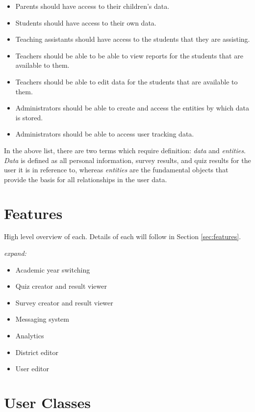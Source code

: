 \begin{itemize}
\item Parents should have access to their children's data.
\item Students should have access to their own data.
\item Teaching assistants should have access to the students that they are assisting.
\item Teachers should be able to be able to view reports for the students that are available to them.
\item Teachers should be able to edit data for the students that are available to them.
\item Administrators should be able to create and access the entities by which data is stored.
\item Administrators should be able to access user tracking data.
\end{itemize}

In the above list, there are two terms which require definition: \emph{data} and \emph{entities}. \emph{Data} is defined as all personal information, survey results, and quiz results for the user it is in reference to, whereas \emph{entities} are the fundamental objects that provide the basis for all relationships in the user data.


\section{Features}
\label{sec:overview-features}
High level overview of each. Details of each will follow in Section \ref{sec:features}.

\textit{expand:}

\begin{itemize}
	\item Academic year switching
	\item Quiz creator and result viewer
	\item Survey creator and result viewer
	\item Messaging system
	\item Analytics
	\item District editor
	\item User editor
\end{itemize}

\section{User Classes}
\label{sec:overview-user-classes}

